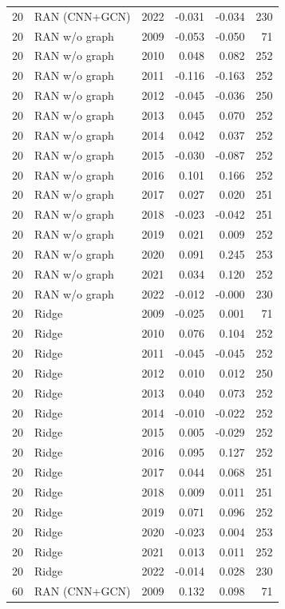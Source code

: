 \begin{table}[htbp]
{\begin{tabular}{llrrrr}
20 & RAN (CNN+GCN) & 2022 & -0.031 & -0.034 & 230 \\
20 & RAN w/o graph & 2009 & -0.053 & -0.050 & 71 \\
20 & RAN w/o graph & 2010 & 0.048 & 0.082 & 252 \\
20 & RAN w/o graph & 2011 & -0.116 & -0.163 & 252 \\
20 & RAN w/o graph & 2012 & -0.045 & -0.036 & 250 \\
20 & RAN w/o graph & 2013 & 0.045 & 0.070 & 252 \\
20 & RAN w/o graph & 2014 & 0.042 & 0.037 & 252 \\
20 & RAN w/o graph & 2015 & -0.030 & -0.087 & 252 \\
20 & RAN w/o graph & 2016 & 0.101 & 0.166 & 252 \\
20 & RAN w/o graph & 2017 & 0.027 & 0.020 & 251 \\
20 & RAN w/o graph & 2018 & -0.023 & -0.042 & 251 \\
20 & RAN w/o graph & 2019 & 0.021 & 0.009 & 252 \\
20 & RAN w/o graph & 2020 & 0.091 & 0.245 & 253 \\
20 & RAN w/o graph & 2021 & 0.034 & 0.120 & 252 \\
20 & RAN w/o graph & 2022 & -0.012 & -0.000 & 230 \\
20 & Ridge & 2009 & -0.025 & 0.001 & 71 \\
20 & Ridge & 2010 & 0.076 & 0.104 & 252 \\
20 & Ridge & 2011 & -0.045 & -0.045 & 252 \\
20 & Ridge & 2012 & 0.010 & 0.012 & 250 \\
20 & Ridge & 2013 & 0.040 & 0.073 & 252 \\
20 & Ridge & 2014 & -0.010 & -0.022 & 252 \\
20 & Ridge & 2015 & 0.005 & -0.029 & 252 \\
20 & Ridge & 2016 & 0.095 & 0.127 & 252 \\
20 & Ridge & 2017 & 0.044 & 0.068 & 251 \\
20 & Ridge & 2018 & 0.009 & 0.011 & 251 \\
20 & Ridge & 2019 & 0.071 & 0.096 & 252 \\
20 & Ridge & 2020 & -0.023 & 0.004 & 253 \\
20 & Ridge & 2021 & 0.013 & 0.011 & 252 \\
20 & Ridge & 2022 & -0.014 & 0.028 & 230 \\
60 & RAN (CNN+GCN) & 2009 & 0.132 & 0.098 & 71 \\

\end{tabular}}
\end{table}
